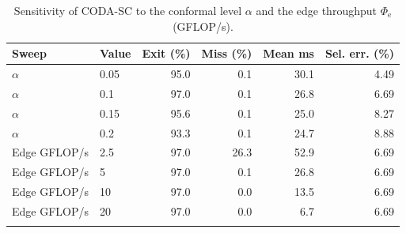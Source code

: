 \documentclass[11pt]{article}
\begin{document}
\begin{table}[t]
\centering
\caption{Sensitivity of CODA-SC to the conformal level $\alpha$ and the edge
throughput $\Phi_{\mathrm{e}}$ (GFLOP/s).}
\label{tab:supp_sensitivity}
\begin{tabular}{llrrrr}
\toprule
Sweep & Value & Exit (\%) & Miss (\%) & Mean ms & Sel. err. (\%) \\
\midrule
$\alpha$ & 0.05 & 95.0 & 0.1 & 30.1 & 4.49 \\
$\alpha$ & 0.1 & 97.0 & 0.1 & 26.8 & 6.69 \\
$\alpha$ & 0.15 & 95.6 & 0.1 & 25.0 & 8.27 \\
$\alpha$ & 0.2 & 93.3 & 0.1 & 24.7 & 8.88 \\
\addlinespace
Edge GFLOP/s & 2.5 & 97.0 & 26.3 & 52.9 & 6.69 \\
Edge GFLOP/s & 5 & 97.0 & 0.1 & 26.8 & 6.69 \\
Edge GFLOP/s & 10 & 97.0 & 0.0 & 13.5 & 6.69 \\
Edge GFLOP/s & 20 & 97.0 & 0.0 & 6.7 & 6.69 \\
\addlinespace
\bottomrule
\end{tabular}
\end{table}

\begin{table}[t]
\centering
\caption{Payload-scaling split-selection diagnostic. Raw-input upload is scaled
by $128\times$, intermediate activation payloads by $0.125\times$, and exits are
disabled in the controller rows to isolate the split/fallback action space. This
is a payload-regime diagnostic rather than learned-codec or hardware evidence.}
\label{tab:supp_splitstress}
\resizebox{\linewidth}{!}{%

}
\end{table}
\end{document}
